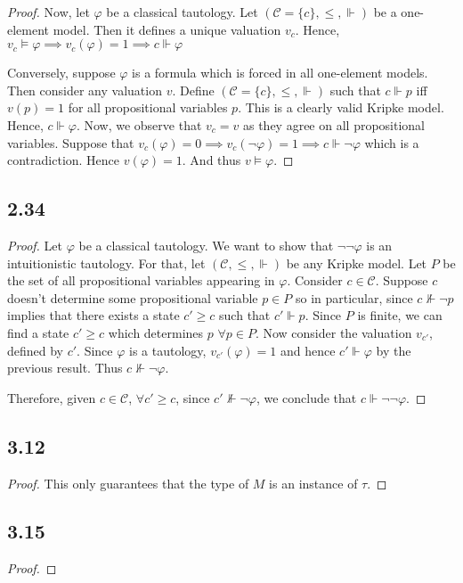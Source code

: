\documentclass[12pt]{article}
\begin{document}
\begin{proof}
Now, let $\varphi$ be a classical tautology. Let $(\mathcal{C} = \{c\}, \leq, \Vdash)$ be a one-element model. Then it defines a unique valuation $v_c$. Hence, $v_c \vDash \varphi \implies v_c(\varphi) = 1 \implies c \Vdash \varphi$

Conversely, suppose $\varphi$ is a formula which is forced in all one-element models. Then consider any valuation $v$. Define $(\mathcal{C} = \{c\}, \leq, \Vdash)$ such that $c \Vdash p$ iff $v(p) = 1$ for all propositional variables $p$. This is a clearly valid Kripke model. Hence, $c \Vdash \varphi$. Now, we observe that $v_c = v$ as they agree on all propositional variables. Suppose that $v_c(\varphi) = 0 \implies v_c(\neg \varphi) = 1 \implies c \Vdash \neg \varphi$ which is a contradiction. Hence $v(\varphi) = 1$. And thus $v \vDash \varphi$.
\end{proof}

\subsection*{2.34}

\begin{proof}
Let $\varphi$ be a classical tautology. We want to show that $\neg \neg \varphi$ is an intuitionistic tautology. For that, let $(\mathcal{C}, \leq, \Vdash)$ be any Kripke model. Let $P$ be the set of all propositional variables appearing in $\varphi$. Consider $c \in \mathcal{C}$. Suppose $c$ doesn't determine some propositional variable $p \in P$ so in particular, since $c \not \Vdash \neg p$ implies that there exists a state $c' \geq c$ such that $c' \Vdash p$. Since $P$ is finite, we can find a state $c' \geq c$ which determines $p$ $\forall p \in P$. Now consider the valuation $v_{c'}$, defined by $c'$. Since $\varphi$ is a tautology, $v_{c'}(\varphi) = 1$ and hence $c' \Vdash \varphi$ by the previous result. Thus $c \not \Vdash \neg \varphi$. 

Therefore, given $c \in \mathcal{C}$, $\forall c' \geq c$, since $c' \not \Vdash \neg \varphi$, we conclude that $c \Vdash \neg \neg \varphi$.
\end{proof}

\subsection*{3.12}
\begin{proof}
This only guarantees that the type of $M$ is an instance of $\tau$.
\end{proof}

\subsection*{3.15}
\begin{proof}
\end{proof}

\vspace{1in} %
\end{document}
